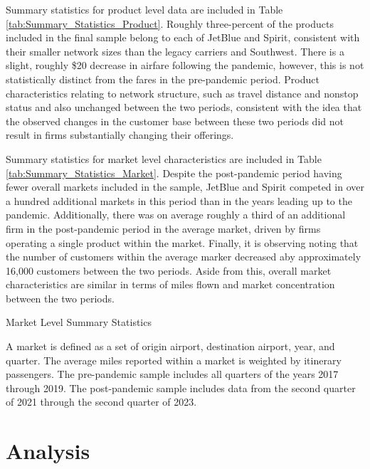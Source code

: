 \documentclass{article}
\begin{document}
    Summary statistics for product level data are included in Table \ref{tab:Summary_Statistics_Product}. Roughly three-percent of the products included in the final sample belong to each of JetBlue and Spirit, consistent with their smaller network sizes than the legacy carriers and Southwest. There is a slight, roughly \$20 decrease in airfare following the pandemic, however, this is not statistically distinct from the fares in the pre-pandemic period. Product characteristics relating to network structure, such as travel distance and nonstop status and also unchanged between the two periods, consistent with the idea that the observed changes in the customer base between these two periods did not result in firms substantially changing their offerings.  

    Summary statistics for market level characteristics are included in Table \ref{tab:Summary_Statistics_Market}. Despite the post-pandemic period having fewer overall markets included in the sample, JetBlue and Spirit competed in over a hundred additional markets in this period than in the years leading up to the pandemic. Additionally, there was on average roughly a third of an additional firm in the post-pandemic period in the average market, driven by firms operating a single product within the market. Finally, it is observing noting that the number of customers within the average marker decreased aby approximately 16,000 customers between the two periods. Aside from this, overall market characteristics are similar in terms of miles flown and market concentration between the two periods. 

    \begin{table}
        \caption{Market Level Summary Statistics}
        \label{tab:Summary_Statistics_Market}
                \vspace{-15mm}
\begin{center}
            
                    \footnotesize{A market is defined as a set of origin airport, destination airport, year, and quarter. The average miles reported within a market is weighted by itinerary passengers. The pre-pandemic sample includes all quarters of the years 2017 through 2019. The post-pandemic sample includes data from the second quarter of 2021 through the second quarter of 2023. }

\end{center}
    \end{table}

	\section{Analysis}
	\label{sec:Analysis}
	
\end{document}
